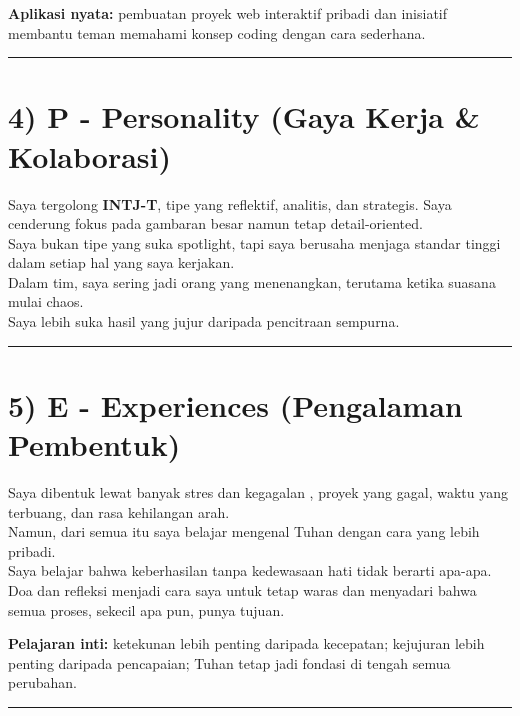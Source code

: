 \documentclass[
  letterpaper,
  DIV=11,
  numbers=noendperiod]{scrreprt}
\begin{document}
\textbf{Aplikasi nyata:} pembuatan proyek web interaktif pribadi dan
inisiatif membantu teman memahami konsep coding dengan cara sederhana.

\begin{center}\rule{0.5\linewidth}{0.5pt}\end{center}

\section{4) P - Personality (Gaya Kerja \&
Kolaborasi)}\label{p---personality-gaya-kerja-kolaborasi}

Saya tergolong \textbf{INTJ-T}, tipe yang reflektif, analitis, dan
strategis. Saya cenderung fokus pada gambaran besar namun tetap
detail-oriented.\\
Saya bukan tipe yang suka spotlight, tapi saya berusaha menjaga standar
tinggi dalam setiap hal yang saya kerjakan.\\
Dalam tim, saya sering jadi orang yang menenangkan, terutama ketika
suasana mulai chaos.\\
Saya lebih suka hasil yang jujur daripada pencitraan sempurna.

\begin{center}\rule{0.5\linewidth}{0.5pt}\end{center}

\section{5) E - Experiences (Pengalaman
Pembentuk)}\label{e---experiences-pengalaman-pembentuk}

Saya dibentuk lewat banyak stres dan kegagalan , proyek yang gagal,
waktu yang terbuang, dan rasa kehilangan arah.\\
Namun, dari semua itu saya belajar mengenal Tuhan dengan cara yang lebih
pribadi.\\
Saya belajar bahwa keberhasilan tanpa kedewasaan hati tidak berarti
apa-apa.\\
Doa dan refleksi menjadi cara saya untuk tetap waras dan menyadari bahwa
semua proses, sekecil apa pun, punya tujuan.

\textbf{Pelajaran inti:} ketekunan lebih penting daripada kecepatan;
kejujuran lebih penting daripada pencapaian; Tuhan tetap jadi fondasi di
tengah semua perubahan.

\begin{center}\rule{0.5\linewidth}{0.5pt}\end{center}
\end{document}
